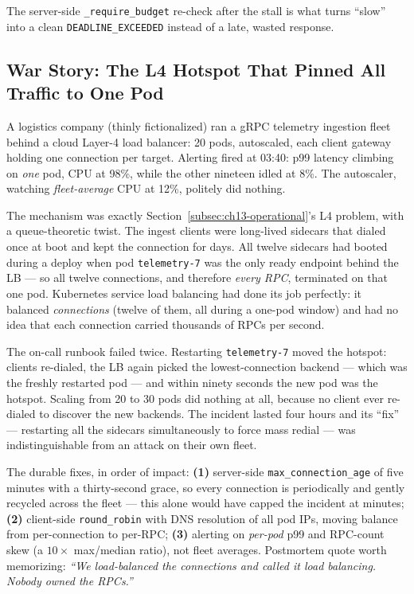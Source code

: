 The server-side \texttt{\_require\_budget} re-check after the stall is what
turns ``slow'' into a clean \texttt{DEADLINE\_EXCEEDED} instead of a late,
wasted response.

\subsection{War Story: The L4 Hotspot That Pinned All Traffic to One Pod}

A logistics company (thinly fictionalized) ran a gRPC telemetry ingestion
fleet behind a cloud Layer-4 load balancer: 20 pods, autoscaled, each client
gateway holding one connection per target. Alerting fired at 03:40: p99
latency climbing on \emph{one} pod, CPU at 98\%, while the other nineteen
idled at 8\%. The autoscaler, watching \emph{fleet-average} CPU at 12\%,
politely did nothing.

The mechanism was exactly Section~\ref{subsec:ch13-operational}'s L4 problem,
with a queue-theoretic twist. The ingest clients were long-lived sidecars that
dialed once at boot and kept the connection for days. All twelve sidecars had
booted during a deploy when pod \texttt{telemetry-7} was the only ready
endpoint behind the LB --- so all twelve connections, and therefore
\emph{every RPC}, terminated on that one pod. Kubernetes service load
balancing had done its job perfectly: it balanced \emph{connections} (twelve
of them, all during a one-pod window) and had no idea that each connection
carried thousands of RPCs per second.

The on-call runbook failed twice. Restarting \texttt{telemetry-7} moved the
hotspot: clients re-dialed, the LB again picked the lowest-connection backend
--- which was the freshly restarted pod --- and within ninety seconds the new
pod was the hotspot. Scaling from 20 to 30 pods did nothing at all, because no
client ever re-dialed to discover the new backends. The incident lasted four
hours and its ``fix'' --- restarting all the sidecars simultaneously to force
mass redial --- was indistinguishable from an attack on their own fleet.

The durable fixes, in order of impact: \textbf{(1)} server-side
\texttt{max\_connection\_age} of five minutes with a thirty-second grace, so
every connection is periodically and gently recycled across the fleet ---
this alone would have capped the incident at minutes; \textbf{(2)} client-side
\texttt{round\_robin} with DNS resolution of all pod IPs, moving balance from
per-connection to per-RPC; \textbf{(3)} alerting on \emph{per-pod} p99 and
RPC-count skew (a $10\times$ max/median ratio), not fleet averages. Postmortem
quote worth memorizing: \emph{``We load-balanced the connections and called it
load balancing. Nobody owned the RPCs.''}


